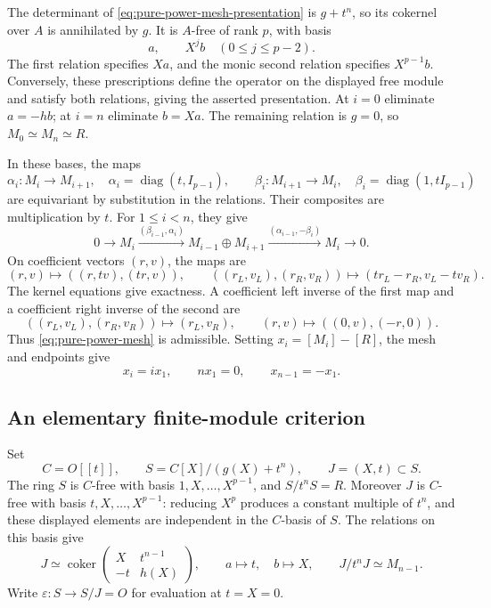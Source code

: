 The determinant of \eqref{eq:pure-power-mesh-presentation} is
\(g+t^n\), so its cokernel over \(A\) is annihilated by \(g\).
It is \(A\)-free of rank \(p\), with basis
\[
 a,\qquad X^jb\quad(0\le j\le p-2).
\]
The first relation specifies \(Xa\), and the monic second relation
specifies \(X^{p-1}b\).  Conversely, these prescriptions define
the operator on the displayed free module and satisfy both relations,
giving the asserted presentation.  At \(i=0\) eliminate \(a=-hb\);
at \(i=n\) eliminate \(b=Xa\).  The remaining relation is \(g=0\),
so \(M_0\simeq M_n\simeq R\).

In these bases, the maps
\[
 \alpha_i:M_i\longrightarrow M_{i+1},\quad
 \alpha_i=\operatorname{diag}(t,I_{p-1}),\qquad
 \beta_i:M_{i+1}\longrightarrow M_i,\quad
 \beta_i=\operatorname{diag}(1,tI_{p-1})
\]
are equivariant by substitution in the relations.  Their composites
are multiplication by \(t\).  For \(1\le i<n\), they give
\begin{equation}\label{eq:pure-power-mesh}
 0\longrightarrow M_i
 \xrightarrow{(\beta_{i-1},\alpha_i)}M_{i-1}\oplus M_{i+1}
 \xrightarrow{(\alpha_{i-1},-\beta_i)}M_i\longrightarrow0.
\end{equation}
On coefficient vectors \((r,v)\), the maps are
\[
 (r,v)\longmapsto((r,tv),(tr,v)),\qquad
 ((r_L,v_L),(r_R,v_R))\longmapsto(tr_L-r_R,v_L-tv_R).
\]
The kernel equations give exactness.  A coefficient left inverse
of the first map and a coefficient right inverse of the second are
\[
 ((r_L,v_L),(r_R,v_R))\longmapsto(r_L,v_R),\qquad
 (r,v)\longmapsto((0,v),(-r,0)).
\]
Thus \eqref{eq:pure-power-mesh} is admissible.  Setting
\(x_i=[M_i]-[R]\), the mesh and endpoints give
\begin{equation}\label{eq:pure-power-mesh-relations}
 x_i=i x_1,\qquad nx_1=0,\qquad x_{n-1}=-x_1.
\end{equation}

\subsection{An elementary finite-module criterion}

Set
\[
 C=O[[t]],\qquad S=C[X]/(g(X)+t^n),\qquad J=(X,t)\subset S.
\]
The ring \(S\) is \(C\)-free with basis \(1,X,\ldots,X^{p-1}\),
and \(S/t^nS=R\).  Moreover \(J\) is \(C\)-free with basis
\(t,X,\ldots,X^{p-1}\): reducing \(X^p\) produces a constant
multiple of \(t^n\), and these displayed elements are independent
in the \(C\)-basis of \(S\).
The relations on this basis give
\begin{equation}\label{eq:pure-power-ideal-lift}
 J\simeq\operatorname{coker}
 \begin{pmatrix}X&t^{n-1}\\-t&h(X)\end{pmatrix},
 \qquad a\longmapsto t,\quad b\longmapsto X,
 \qquad J/t^nJ\simeq M_{n-1}.
\end{equation}
Write \(\varepsilon:S\to S/J=O\) for evaluation at \(t=X=0\).

